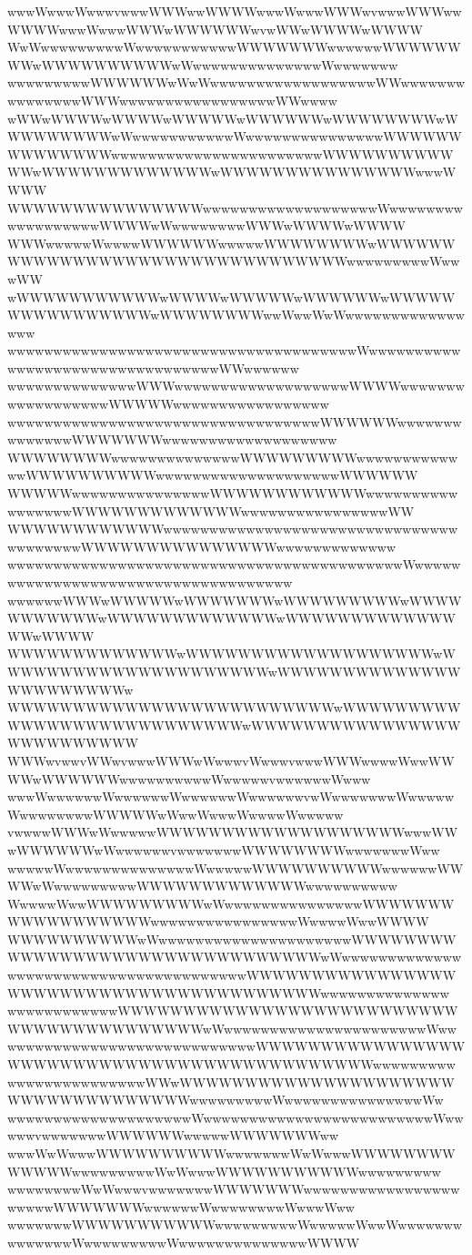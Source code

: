 \documentclass[a4paper]{article}
\begin{document}
\begin{procgrass}{\NabeAzz}
wwwWwwwWwwwvwwwWWWwwWWWWwwwWwwwWWWwvwwwWWWwwWWWWwwwWwwwWWWwWWWWWWwvwWWwWWWWwWWWW
WwWwwwwwwwwwWwwwwwwwwwwwWWWWWWWwwwwwwWWWWWWWWwWWWWWWWWWWwWwwwwwwwwwwwwwwWwwwwwww
wwwwwwwwwWWWWWWwWwWwwwwwwwwwwwwwwwwwwWWwwwwwwwwwwwwwwwWWWwwwwwwwwwwwwwwwwwWWwwww
wWWwWWWWwWWWWwWWWWWwWWWWWWwWWWWWWWWwWWWWWWWWWwWwwwwwwwwwwwWwwwwwwwwwwwwwwwWWWWWW
WWWWWWWWwwwwwwwwwwwwwwwwwwwwwwwWWWWWWWWWWWWwWWWWWWWWWWWWWwWWWWWWWWWWWWWWWwwwWWWW
WWWWWWWWWWWWWWWwwwwwwwwwwwwwwwwwwwWwwwwwwwwwwwwwwwwwwWWWWwWwwwwwwwwWWWwWWWWwWWWW
WWWwwwwwWwwwwWWWWWWwwwwwWWWWWWWWwWWWWWWWWWWWWWWWWWWWWWWWWWWWWWWWWwwwwwwwwwWwwwWW
wWWWWWWWWWWWwWWWWwWWWWWwWWWWWWwWWWWWWWWWWWWWWWWwWWWWWWWWwwWwwWwWwwwwwwwwwwwwwwww
wwwwwwwwwwwwwwwwwwwwwwwwwwwwwwwwwwwwwwWwwwwwwwwwwwwwwwwwwwwwwwwwwwwwwwwwWWwwwwww
wwwwwwwwwwwwwwWWWwwwwwwwwwwwwwwwwwwwWWWWwwwwwwwwwwwwwwwwwwWWWWWwwwwwwwwwwwwwwwww
wwwwwwwwwwwwwwwwwwwwwwwwwwwwwwwwwwWWWWWWwwwwwwwwwwwwwwWWWWWWWwwwwwwwwwwwwwwwwwww
WWWWWWWWwwwwwwwwwwwwwwWWWWWWWWWwwwwwwwwwwwwwWWWWWWWWWWwwwwwwwwwwwwwwwwwwwwWWWWWW
WWWWWwwwwwwwwwwwwwwwWWWWWWWWWWWWwwwwwwwwwwwwwwwwwWWWWWWWWWWWWWwwwwwwwwwwwwwwwwWW
WWWWWWWWWWWWwwwwwwwwwwwwwwwwwwwwwwwwwwwwwwwwwwwwwwwwWWWWWWWWWWWWWWWwwwwwwwwwwwww
wwwwwwwwwwwwwwwwwwwwwwwwwwwwwwwwwwwwwwwwwwwWwwwwwwwwwwwwwwwwwwwwwwwwwwwwwwwwwwww
wwwwwwWWWwWWWWWwWWWWWWWwWWWWWWWWWwWWWWWWWWWWWwWWWWWWWWWWWWWwWWWWWWWWWWWWWWWwWWWW
WWWWWWWWWWWWWwWWWWWWWWWWWWWWWWWWWwWWWWWWWWWWWWWWWWWWWWWwWWWWWWWWWWWWWWWWWWWWWWWw
WWWWWWWWWWWWWWWWWWWWWWWWWwWWWWWWWWWWWWWWWWWWWWWWWWWWWwWWWWWWWWWWWWWWWWWWWWWWWWWW
WWWwvwwvWWwvwwwWWWwWwwwvWwwwvwwwWWWwwwwWwwWWWWwWWWWWWwwwwwwwwwwWwwwwwvwwwwwwWwww
wwwWwwwwwwWwwwwwwWwwwwwwWwwwwwwvwWwwwwwwwWwwwwwWwwwwwwwwWWWWWwWwwWwwwWwwwwWwwwww
vwwwwWWWwWwwwwwWWWWWWWWWWWWWWWWWWWwwwWWwWWWWWWwWwwwwwwvwwwwwwwWWWWWWWWwwwwwwwWww
wwwwwWwwwwwwwwwwwwwwWwwwwwWWWWWWWWWWwwwwwwWWWWwWwwwwwwwwwWWWWWWWWWWWWWwwwwwwwwww
WwwwwWwwWWWWWWWWWwWwwwwwwwwwwwwwwwWWWWWWWWWWWWWWWWWWwwwwwwwwwwwwwwwwWwwwwWwwWWWW
WWWWWWWWWWwWwwwwwwwwwwwwwwwwwwwwwWWWWWWWWWWWWWWWWWWWWWWWWWWWWWWWWwWwwwwwwwwwwwww
wwwwwwwwwwwwwwwwwwwwwwwwwwWWWWWWWWWWWWWWWWWWWWWWWWWWWWWWWWWWWWWWWWwwwwwwwwwwwwww
wwwwwwwwwwwwWWWWWWWWWWWWWWWWWWWWWWWWWWWWWWWWWWWWWWWWWwWwwwwwwwwwwwwwwwwwwwwwwWww
wwwwwwwwwwwwwwwwwwwwwwwwwwwWWWWWWWWWWWWWWWWWWWWWWWWWWWWWWWWWWWWWWWWWWWWwwwwwwwww
wwwwwwwwwwwwwwwWWwWWWWWWWWWWWWWWWWWWWWWWWWWWWWWWWWWWWwwwwwwwwwWwwwwwwwwwwwwwwwWw
wwwwwwwwwwwwwwwwwwwwWwwwwwwwwwwwwwwwwwwwwwwwwwWwwwwwvwwwwwwwWWWWWWwwwwwWWWWWWWww
wwwWwWwwwWWWWWWWWWWwwwwwwwWwWwwwWWWWWWWWWWWWWwwwwwwwwwWwWwwwWWWWWWWWWWWwwwwwwwww
wwwwwwwwWwWwwwvwwwwwwwWWWWWWWwwwwwwwwwwwwwwwwwwwwwwWWWWWWWwwwwwwWwwwwwwwwWwwwWww
wwwwwwwWWWWWWWWWWWwwwwwwwwwWwwwwwWwwWwwwwwwwwwwwwwwWwwwwwwwwwWwwwwwwwwwwwwwwWWWW

\end{procgrass}
\end{document}
